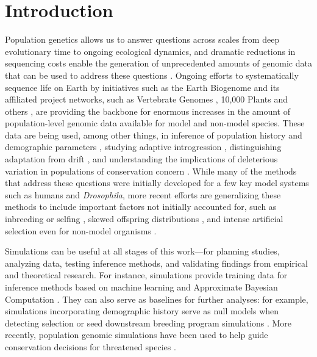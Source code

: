 \documentclass[hidelinks]{article}
\begin{document}
\section*{Introduction}
    \label{introduction}

Population genetics allows us to answer questions across scales from deep evolutionary time to ongoing ecological dynamics,
and dramatic reductions in sequencing costs enable the generation of
unprecedented amounts of genomic data that can be used to address these questions \citep{Ellegren2014}.
Ongoing efforts to systematically sequence life on
Earth by initiatives such as the Earth Biogenome \citep{Lewin2022} and its
affiliated project networks, such as Vertebrate Genomes
\citep{Rhie2021}, 10,000 Plants \citep{Cheng2018} and others \citep{darwin2022sequence},
are providing the backbone for enormous increases in the amount of population-level genomic data available for model and non-model species.
These data are being used, among other things,
in inference of population history and demographic parameters \citep{Beichman2018},
studying adaptive introgression \citep{Gower2021},
distinguishing adaptation from drift \citep[e.g.][]{Leigh2021},
and understanding the implications of deleterious variation in populations of conservation concern \citep[e.g.][]{Robinson2023}.
While many of the methods that address these questions were initially developed for a few key model systems such as humans and \emph{Drosophila},
more recent efforts are generalizing these methods to include 
important factors not initially accounted for,
such as inbreeding or selfing \citep{Blischak2020},
skewed offspring distributions \citep{Montano2016},
and intense artificial selection
even for non-model organisms \citep{MacLeod2013, MacLeod2014}.

Simulations can be useful at all stages of this work---for
planning studies, analyzing data, testing inference methods,
and validating findings from empirical and theoretical research.
For instance, simulations provide training data
for inference methods based on machine learning \citep{Schrider2018} and
Approximate Bayesian Computation \citep{Csillery2010}. They can also serve as
baselines for further analyses: for example, simulations incorporating
demographic history serve as null models when detecting selection \citep{Hsieh2016a}
or seed downstream breeding program simulations \citep{Gaynor2020}.
More recently, population genomic simulations have been used to help guide conservation decisions for threatened species
\citep{Teixeira2021,kyriazis2022using}.
\end{document}
